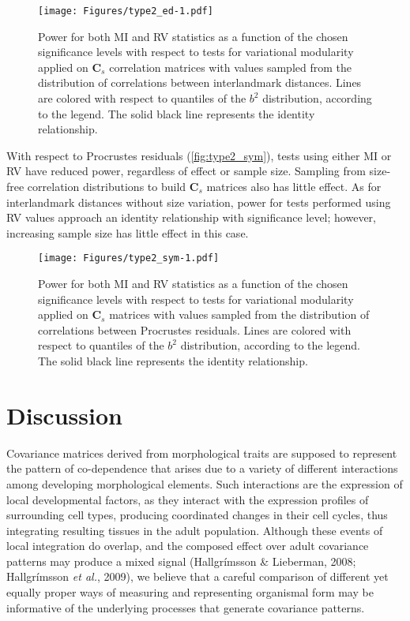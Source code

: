 \documentclass[12pt,]{article}
\begin{document}
\begin{figure}[htbp]
\centering
\texttt{[image: Figures/type2\_ed-1.pdf]}
\caption{Power for both MI and RV statistics as a function of the chosen
significance levels with respect to tests for variational modularity
applied on $\mathbf{C}_s$ correlation matrices with values sampled from
the distribution of correlations between interlandmark distances. Lines
are colored with respect to quantiles of the $b^2$ distribution,
according to the legend. The solid black line represents the identity
relationship. \label{fig:type2_ed}}
\end{figure}

With respect to Procrustes residuals (\autoref{fig:type2_sym}), tests
using either MI or RV have reduced power, regardless of effect or sample
size. Sampling from size-free correlation distributions to build
$\mathbf{C}_s$ matrices also has little effect. As for interlandmark
distances without size variation, power for tests performed using RV
values approach an identity relationship with significance level;
however, increasing sample size has little effect in this case.

\begin{figure}[htbp]
\centering
\texttt{[image: Figures/type2\_sym-1.pdf]}
\caption{Power for both MI and RV statistics as a function of the chosen
significance levels with respect to tests for variational modularity
applied on $\mathbf{C}_s$ matrices with values sampled from the
distribution of correlations between Procrustes residuals. Lines are
colored with respect to quantiles of the $b^2$ distribution, according
to the legend. The solid black line represents the identity
relationship. \label{fig:type2_sym}}
\end{figure}

\section{Discussion}\label{discussion}

Covariance matrices derived from morphological traits are supposed to
represent the pattern of co-dependence that arises due to a variety of
different interactions among developing morphological elements. Such
interactions are the expression of local developmental factors, as they
interact with the expression profiles of surrounding cell types,
producing coordinated changes in their cell cycles, thus integrating
resulting tissues in the adult population. Although these events of
local integration do overlap, and the composed effect over adult
covariance patterns may produce a mixed signal (Hallgrímsson \&
Lieberman, 2008; Hallgrímsson \emph{et al.}, 2009), we believe that a
careful comparison of different yet equally proper ways of measuring and
representing organismal form may be informative of the underlying
processes that generate covariance patterns.
\end{document}
